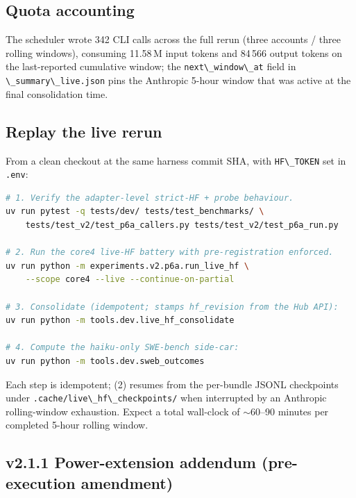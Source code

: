 \subsection{Quota accounting}\label{live-hf-quota}

The scheduler wrote 342 CLI calls across the full rerun (three
accounts / three rolling windows), consuming 11.58\,M input tokens and
84\,566 output tokens on the last-reported cumulative window; the
\passthrough{\lstinline!next\_window\_at!} field in
\passthrough{\lstinline!\_summary\_live.json!} pins the Anthropic 5-hour
window that was active at the final consolidation time.

\subsection{Replay the live rerun}\label{live-hf-replay}

From a clean checkout at the same harness commit SHA, with
\passthrough{\lstinline!HF\_TOKEN!} set in \passthrough{\lstinline!.env!}:

\begin{lstlisting}[language=bash]
# 1. Verify the adapter-level strict-HF + probe behaviour.
uv run pytest -q tests/dev/ tests/test_benchmarks/ \
    tests/test_v2/test_p6a_callers.py tests/test_v2/test_p6a_run.py

# 2. Run the core4 live-HF battery with pre-registration enforced.
uv run python -m experiments.v2.p6a.run_live_hf \
    --scope core4 --live --continue-on-partial

# 3. Consolidate (idempotent; stamps hf_revision from the Hub API):
uv run python -m tools.dev.live_hf_consolidate

# 4. Compute the haiku-only SWE-bench side-car:
uv run python -m tools.dev.sweb_outcomes
\end{lstlisting}

Each step is idempotent; (2) resumes from the per-bundle JSONL
checkpoints under
\passthrough{\lstinline!.cache/live\_hf\_checkpoints/!} when interrupted
by an Anthropic rolling-window exhaustion. Expect a total wall-clock of
\(\sim\)60--90 minutes per completed 5-hour rolling window.

\subsection{v2.1.1 Power-extension addendum (pre-execution
amendment)}\label{live-hf-v2.1.1}

